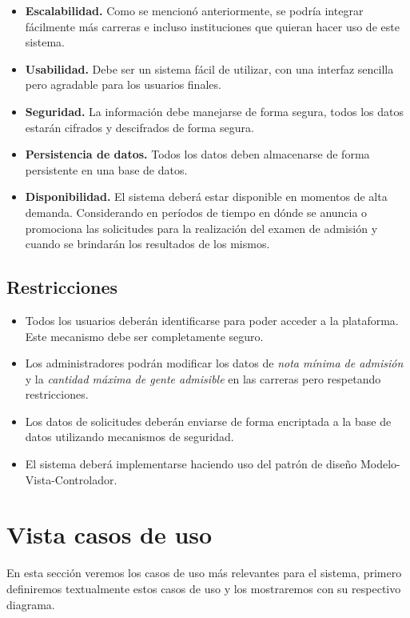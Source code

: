 \documentclass[12pt,a4paper]{article}
\begin{document}
\begin{itemize}
  \item \textbf{Escalabilidad.} Como se mencionó anteriormente, se podría integrar fácilmente más carreras e incluso instituciones que quieran hacer uso de este sistema.
  \item \textbf{Usabilidad.} Debe ser un sistema fácil de utilizar, con una interfaz sencilla pero agradable para los usuarios finales.
  \item \textbf{Seguridad.} La información debe manejarse de forma segura, todos los datos estarán cifrados y descifrados de forma segura.
  \item \textbf{Persistencia de datos.} Todos los datos deben almacenarse de forma persistente en una base de datos.
  \item \textbf{Disponibilidad.} El sistema deberá estar disponible en momentos de alta demanda. Considerando en períodos de tiempo en dónde se anuncia o promociona las solicitudes para la realización del examen de admisión y cuando se brindarán los resultados de los mismos.
\end{itemize}

\subsection{Restricciones}
\begin{itemize}
  \item Todos los usuarios deberán identificarse para poder acceder a la plataforma. Este mecanismo debe ser completamente seguro.
  \item Los administradores podrán modificar los datos de \textit{nota mínima de admisión} y la \textit{cantidad máxima de gente admisible} en las carreras pero respetando restricciones.
  \item Los datos de solicitudes deberán enviarse de forma encriptada a la base de datos utilizando mecanismos de seguridad.
  \item El sistema deberá implementarse haciendo uso del patrón de diseño Modelo-Vista-Controlador.
\end{itemize}

\section{Vista casos de uso}

En esta sección veremos los casos de uso más relevantes para el sistema, primero definiremos textualmente estos casos de uso y los mostraremos con su respectivo diagrama.
\end{document}
